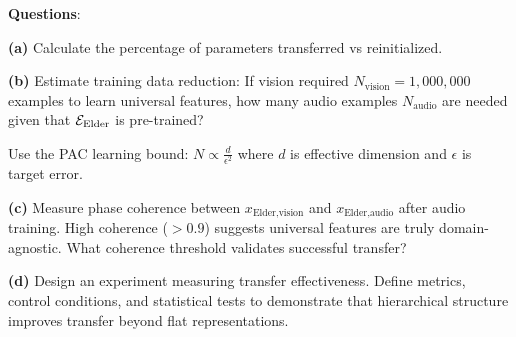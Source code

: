 \begin{application}
\textbf{Questions}:

\textbf{(a)} Calculate the percentage of parameters transferred vs reinitialized.

\textbf{(b)} Estimate training data reduction: If vision required $N_{\text{vision}} = 1,000,000$ examples to learn universal features, how many audio examples $N_{\text{audio}}$ are needed given that $\mathcal{E}_{\text{Elder}}$ is pre-trained?

Use the PAC learning bound: $N \propto \frac{d}{\epsilon^2}$ where $d$ is effective dimension and $\epsilon$ is target error.

\textbf{(c)} Measure phase coherence between $x_{\text{Elder,vision}}$ and $x_{\text{Elder,audio}}$ after audio training. High coherence ($> 0.9$) suggests universal features are truly domain-agnostic. What coherence threshold validates successful transfer?

\textbf{(d)} Design an experiment measuring transfer effectiveness. Define metrics, control conditions, and statistical tests to demonstrate that hierarchical structure improves transfer beyond flat representations.

\end{application}

